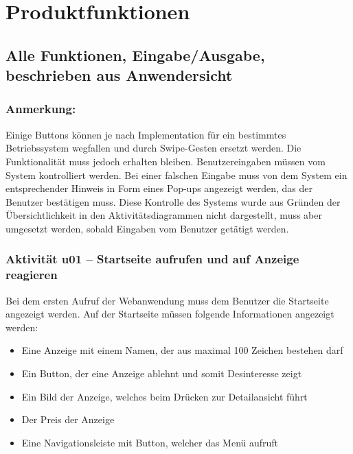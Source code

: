 \documentclass[a4paper,12pt,oneside]{scrartcl}
\begin{document}
\section{Produktfunktionen}
\subsection{Alle Funktionen, Eingabe/Ausgabe, beschrieben aus Anwendersicht}

\subsubsection*{Anmerkung:}
Einige Buttons können je nach Implementation für ein bestimmtes Betriebssystem wegfallen und durch Swipe-Gesten ersetzt werden.
Die Funktionalität muss jedoch erhalten bleiben. 
Benutzereingaben müssen vom System kontrolliert werden.
Bei einer falschen Eingabe muss von dem System ein entsprechender Hinweis in Form eines Pop-ups angezeigt werden, das der Benutzer bestätigen muss.
Diese Kontrolle des Systems wurde aus Gründen der Übersichtlichkeit in den Aktivitätsdiagrammen nicht dargestellt, muss aber umgesetzt werden, sobald Eingaben vom Benutzer getätigt werden.


%


\hypertarget{u01}{\subsubsection{Aktivität u01 – Startseite aufrufen und auf Anzeige reagieren}}
Bei dem ersten Aufruf der Webanwendung muss dem Benutzer die Startseite angezeigt werden. 
Auf der Startseite müssen folgende Informationen angezeigt werden:
\begin{itemize}
	\item Eine Anzeige mit einem Namen, der aus maximal 100 Zeichen bestehen darf
	\item Ein Button, der eine Anzeige ablehnt und somit Desinteresse zeigt
	\item Ein Bild der Anzeige, welches beim Drücken zur Detailansicht führt
	\item Der Preis der Anzeige
	\item Eine Navigationsleiste mit Button, welcher das Menü aufruft
\end{itemize}
\end{document}
